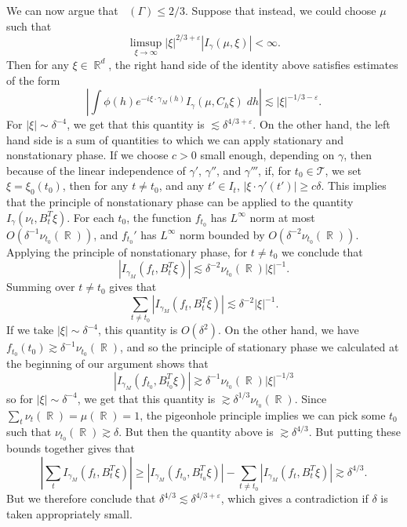 \documentclass[dvipsnames,letterpaper,12pt]{article}
\DeclareMathOperator{\fordim}{\dim_{\mathbb{F}}}
\DeclareMathOperator{\RR}{\mathbb{R}}
\begin{document}
We can now argue that $\fordim(\Gamma) \leq 2/3$. Suppose that instead, we could choose $\mu$ such that
%
\[ \limsup_{\xi \to \infty} |\xi|^{2/3 + \varepsilon} |I_\gamma(\mu, \xi)| < \infty. \]
%
Then for any $\xi \in \RR^d$, the right hand side of the identity above satisfies estimates of the form
%
\[ \left| \int \phi(h) e^{-i \xi \cdot \gamma_M(h)} I_\gamma(\mu, C_h \xi)\; dh \right| \lesssim |\xi|^{-1/3 - \varepsilon}. \]
%
For $|\xi| \sim \delta^{-4}$, we get that this quantity is $\lesssim \delta^{4/3 + \varepsilon}$. On the other hand, the left hand side is a sum of quantities to which we can apply stationary and nonstationary phase. If we choose $c > 0$ small enough, depending on $\gamma$, then because of the linear independence of $\gamma'$, $\gamma''$, and $\gamma'''$, if, for $t_0 \in \mathcal{T}$, we set $\xi = \xi_0(t_0)$, then for any $t \neq t_0$, and any $t' \in I_t$, $|\xi \cdot \gamma'(t')| \geq c \delta$. This implies that the principle of nonstationary phase can be applied to the quantity $I_\gamma(\nu_t, B_t^T \xi)$. For each $t_0$, the function $f_{t_0}$ has $L^\infty$ norm at most $O(\delta^{-1} \nu_{t_0}(\RR))$, and $f_{t_0}'$ has $L^\infty$ norm bounded by $O(\delta^{-2} \nu_{t_0}(\RR))$. Applying the principle of nonstationary phase, for $t \neq t_0$ we conclude that
%
\[ |I_{\gamma_M}(f_t, B_t^T \xi)| \lesssim \delta^{-2} \nu_{t_0}(\RR) |\xi|^{-1}. \]
%
Summing over $t \neq t_0$ gives that
%
\[ \sum_{t \neq t_0} |I_{\gamma_M}(f_t, B_t^T \xi)| \lesssim \delta^{-2} |\xi|^{-1}. \]
%
If we take $|\xi| \sim \delta^{-4}$, this quantity is $O(\delta^2)$. On the other hand, we have $f_{t_0}(t_0) \gtrsim \delta^{-1} \nu_{t_0}(\RR)$, and so the principle of stationary phase we calculated at the beginning of our argument shows that
%
\[ |I_{\gamma_M}(f_{t_0}, B_{t_0}^T \xi)| \gtrsim \delta^{-1} \nu_{t_0}(\RR) |\xi|^{-1/3} \]
%
so for $|\xi| \sim \delta^{-4}$, we get that this quantity is $\gtrsim \delta^{1/3} \nu_{t_0}(\RR)$. Since $\sum_t \nu_t(\RR) = \mu(\RR) = 1$, the pigeonhole principle implies we can pick some $t_0$ such that $\nu_{t_0}(\RR) \gtrsim \delta$. But then the quantity above is $\gtrsim \delta^{4/3}$. But putting these bounds together gives that
%
\[ |\sum_t I_{\gamma_M}(f_t, B_t^T \xi)| \geq |I_{\gamma_M}(f_{t_0}, B_{t_0}^T \xi)| - \sum_{t \neq t_0} |I_{\gamma_M}(f_t, B_t^T \xi)| \gtrsim \delta^{4/3}. \]
%
But we therefore conclude that $\delta^{4/3} \lesssim \delta^{4/3 + \varepsilon}$, which gives a contradiction if $\delta$ is taken appropriately small.

%
%
%
%
\end{document}
